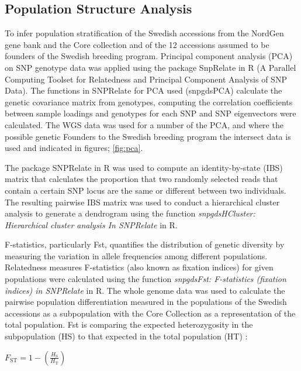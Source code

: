 \documentclass[9pt, twocolumn,twoside]{gsajnl}
\begin{document}
\subsection{Population Structure Analysis}
To infer population stratification of the Swedish accessions from the NordGen gene bank and the Core collection and of the 12 accessions assumed to be founders of the Swedish breeding program. Principal component analysis (PCA) on SNP genotype data was applied using the package SnpRelate in R (A Parallel Computing Toolset for Relatedness and Principal Component Analysis of SNP Data). The functions in SNPRelate for PCA used (snpgdsPCA) calculate the genetic covariance matrix from genotypes, computing the correlation coefficients between sample loadings and genotypes for each SNP and SNP eigenvectors were calculated. The WGS data was used for a number of the PCA, and where the possible genetic Founders to the Swedish breeding program the intersect data is used and indicated in figures; \ref{fig:pca}.

The package SNPRelate in R was used to compute an identity-by-state (IBS) matrix that calculates the proportion that two randomly selected reads that contain a certain SNP locus are the same or different between two individuals. The resulting pairwise IBS matrix was used to conduct a hierarchical cluster analysis to generate a dendrogram using the function \textit{snpgdsHCluster: Hierarchical cluster analysis In SNPRelate }in R. 

F-statistics, particularly Fst, quantifies the distribution of genetic diversity by measuring the variation in allele frequencies among different populations. 
Relatedness measures F-statistics (also known as fixation indices) for given populations were calculated using the function \textit{snpgdsFst: F-statistics (fixation indices) in SNPRelate }in R. The whole genome data was used to calculate the pairwise population differentiation measured in the populations of the Swedish accessions as a subpopulation with the Core Collection as a representation of the total population. Fst is comparing the expected heterozygosity in the subpopulation (HS) to that expected in the total population (HT) :

$F_{\text{ST}} = 1 - \left(\frac{H_{\text{S}}}{H_{\text{T}}}\right)$
\end{document}

